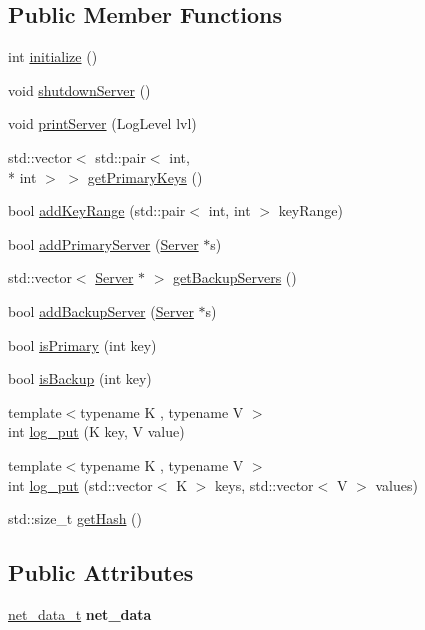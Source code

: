 \subsection*{Public Member Functions}
\begin{DoxyCompactItemize}
\item 
int \hyperlink{classServer_ae94d08657f48a3b51b411463f1137375}{initialize} ()
\item 
void \hyperlink{classServer_a4ce7fd6ac1a1f940db29e57f5f33ae9b}{shutdown\-Server} ()
\item 
void \hyperlink{classServer_aafbaecfe9f27c9eeb811a1bfde5e6c2e}{print\-Server} (Log\-Level lvl)
\item 
std\-::vector$<$ std\-::pair$<$ int, \\*
int $>$ $>$ \hyperlink{classServer_ad303d839086eee11137e6fc4a4bb95ab}{get\-Primary\-Keys} ()
\item 
bool \hyperlink{classServer_a395d7cb7194064c961710663926e4a3d}{add\-Key\-Range} (std\-::pair$<$ int, int $>$ key\-Range)
\item 
bool \hyperlink{classServer_a2f865f52beecb3be03eda85b4dc64e3e}{add\-Primary\-Server} (\hyperlink{classServer}{Server} $\ast$s)
\item 
std\-::vector$<$ \hyperlink{classServer}{Server} $\ast$ $>$ \hyperlink{classServer_a71a34c248da1cb74f3453f06223a606e}{get\-Backup\-Servers} ()
\item 
bool \hyperlink{classServer_ab272570a3b1d8eb7f9037c9e7b4e5f2a}{add\-Backup\-Server} (\hyperlink{classServer}{Server} $\ast$s)
\item 
bool \hyperlink{classServer_a9bd7a3b2b12f2f5bddd68eb245111d02}{is\-Primary} (int key)
\item 
bool \hyperlink{classServer_a66708ca0f53116a15258353cc60d1fd4}{is\-Backup} (int key)
\item 
{\footnotesize template$<$typename K , typename V $>$ }\\int \hyperlink{classServer_afb4289a5db1c23ac566dbb085a8f91fb}{log\-\_\-put} (K key, V value)
\item 
{\footnotesize template$<$typename K , typename V $>$ }\\int \hyperlink{classServer_ae419ba1245066b80f42302bb0c86ed00}{log\-\_\-put} (std\-::vector$<$ K $>$ keys, std\-::vector$<$ V $>$ values)
\item 
std\-::size\-\_\-t \hyperlink{classServer_adecf34082977620ca31ca8eab317cf6d}{get\-Hash} ()
\end{DoxyCompactItemize}
\subsection*{Public Attributes}
\begin{DoxyCompactItemize}
\item 
\hypertarget{classServer_a07efcbe5e0d7388a704520e5080a4f7c}{\hyperlink{structnet__data__t}{net\-\_\-data\-\_\-t} {\bfseries net\-\_\-data}}\label{classServer_a07efcbe5e0d7388a704520e5080a4f7c}

\end{DoxyCompactItemize}
